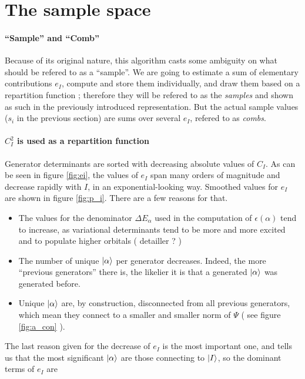 \documentclass[./thesis.tex]{subfiles}
\begin{document}
\section{The sample space}

\paragraph{``Sample'' and ``Comb''}
Because of its original nature, this algorithm casts some ambiguity on what should be refered to as a ``sample''. We are going to estimate a sum of elementary contributions $e_I$, compute and store them individually, and draw them based on a repartition function ; therefore they will be refered to as the \emph{samples} and shown as such in the previously introduced representation. But the actual sample values ($s_i$ in the previous section) are sums over several $e_I$, refered to as \emph{combs}.


\paragraph{$C_I^2$ is used as a repartition function}
Generator determinants are sorted with decreasing absolute values of $C_I$.
	As can be seen in figure \ref{fig:ei}, the values of $e_I$ span many orders of magnitude and decrease rapidly with $I$, in an exponential-looking way. Smoothed values for $e_I$ are shown in figure \ref{fig:p_i}. There are a few reasons for that.
\begin{itemize}
	\item
	The values for the denominator $\Delta E_\alpha$ used in the computation of $\epsilon(\alpha)$ tend to increase, as variational determinants tend to be more and more excited and to populate higher orbitals ( detailler ? )
	\item
	The number of unique $\ket \alpha$ per generator decreases. Indeed, the more ``previous generators'' there is, the likelier it is that a generated $\ket \alpha$ was generated before.
	\item
	Unique $\ket \alpha$ are, by construction, disconnected from all previous generators, which mean they connect to a smaller and smaller norm of $\Psi$ ( see figure \ref{fig:a_con} ). 
\end{itemize}


The last reason given for the decrease of $e_I$ is the most important one, and tells us that the most significant $\ket \alpha$ are those connecting to ${\ket{I}}$, so the dominant terms of $e_I$ are 
\end{document}
